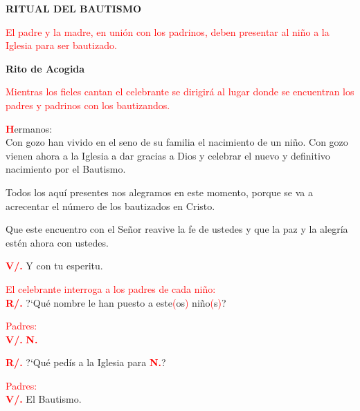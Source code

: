 \documentclass[12pt, letterpaper, spanish]{article}
\begin{document}
  \begin{center}
    \Huge {\bfseries RITUAL DEL BAUTISMO}
  \end{center}

  \large {\textcolor{red}{El padre y la madre, en uni\'on con los padrinos, deben presentar al ni\~no a la Iglesia para ser bautizado.}}

  \begin{center}
    \Huge {\bfseries Rito de Acogida}
  \end{center}

  \large {\textcolor{red}{Mientras los fieles cantan el celebrante se dirigir\'a al lugar donde se encuentran los padres y padrinos con los bautizandos.}}

  \lettrine[lines=2]{\bfseries \textcolor{red}{H}}{}\Large {ermanos:}\\
  \Large{Con gozo han vivido en el seno de su familia el nacimiento de un ni\~no. Con gozo vienen ahora a la Iglesia a dar gracias a Dios y celebrar el nuevo y definitivo nacimiento por el Bautismo.}

  \noindent
  \Large {Todos los aqu\'i presentes nos alegramos en este momento, porque se va a acrecentar el n\'umero de los bautizados en Cristo.}

  \noindent
  \Large {Que este encuentro con el Se\~nor reavive la fe de ustedes y que la paz y la alegr\'ia est\'en ahora con ustedes.}

  \noindent
  \Large{{\bfseries \textcolor{red}{V/.}} \hspace{1cm} Y con tu esperitu.}

  \large {\textcolor{red}{El celebrante interroga a los padres de cada ni\~no:}}\\
  \Large {\bfseries \textcolor{red}{R/.}} \hspace{1cm} ?`Qu\'e nombre le han puesto a este\textcolor{red}{(}os\textcolor{red}{)} ni\~no\textcolor{red}{(}s\textcolor{red}{)}?

  \large {\textcolor{red}{Padres:}}\\
  {\bfseries \textcolor{red}{V/.}} \hspace{1cm} \Large {\bfseries \textcolor{red}{N.}}

  \noindent
  \Large {{\bfseries \textcolor{red}{R/.}} \hspace{1cm} ?`Qu\'e ped\'is a la Iglesia para \bfseries \textcolor{red}{N.}}?

  \large {\textcolor{red}{Padres:}}\\
  {\bfseries \textcolor{red}{V/.}} \hspace{1cm} El Bautismo.
\end{document}
